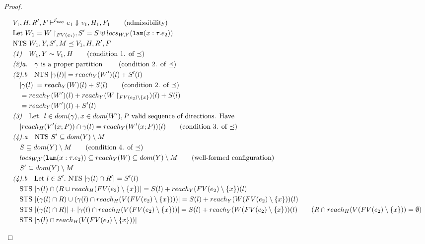 \documentclass[11pt]{article}
\newcommand{\ms}[1]{\ensuremath{\mathsf{#1}}}
\newcommand{\irl}[1]{\mathtt{#1}}
\newcommand{\copySem}{\ensuremath{\mathcal{E}_{\ms{copy}}}}
\theoremstyle{definition}
\begin{document}
\begin{proof}
\begin{description}
\begin{align*}
		&V_1,H,R',F \vdash^{\copySem} e_1 \Downarrow v_1,H_1,F_1 \tag{admissibility}\\
		&\text{Let } W_1 = W \restriction_{FV(e_1)}, S' = S \uplus locs_{W,Y}(\irl{lam}(x : \tau.e_2))\\
		&\text{NTS } W_1,Y,S',M \preceq V_1,H,R',F\\
		&\emph{(1)}\quad W_1,Y \sim V_1,H \tag{condition 1. of $\preceq$}\\
		&\emph{(2)a.}\quad \gamma \text{ is a proper partition } \tag{condition 2. of $\preceq$}\\
		&\emph{(2).b}\quad \text{NTS } |\gamma(l)| = reach_Y(W')(l) + S'(l)\\
		&\quad |\gamma(l)| = reach_Y(W)(l) + S(l) \tag{condition 2. of $\preceq$}\\
		&\quad = reach_Y(W')(l) + reach_Y(W\restriction_{FV(e_2)\setminus \{x\}})(l) + S(l)\\
		&\quad = reach_Y(W')(l) + S'(l)\\
		&\emph{(3)}\quad \text{Let. } l \in dom(\gamma), x \in dom(W'), P \text{ valid sequence of 
		directions. Have }\\
		&\quad |reach_H(V'(x;P)) \cap \gamma(l) = reach_Y(W'(x;P))(l) 
			\tag{condition 3. of $\preceq$}\\
		&\emph{(4).a}\quad \text{NTS } S' \subseteq dom(Y)\setminus M\\
		&\quad S \subseteq dom(Y)\setminus M \tag{condition 4. of $\preceq$}\\
		&\quad locs_{W,Y}(\irl{lam}(x : \tau.e_2)) \subseteq reach_Y(W) \subseteq dom(Y) \setminus M
			\tag{well-formed configuration}\\
		&\quad S' \subseteq dom(Y)\setminus M\\ 
		&\emph{(4).b}\quad \text{Let } l \in S'. \text{ NTS } |\gamma(l) \cap R'| = S'(l)\\
		&\quad \text{STS }  |\gamma(l) \cap (R \cup reach_H(FV(e_2) \setminus \{x\})| = S(l) + 
			reach_Y(FV(e_2) \setminus \{x\})(l)\\
		&\quad \text{STS } |(\gamma(l) \cap R) \cup (\gamma(l) \cap 
			reach_H(V(FV(e_2) \setminus \{x\})))| 
			= S(l) + reach_Y(W(FV(e_2) \setminus \{x\}))(l)\\
		&\quad \text{STS } |(\gamma(l) \cap R)| + |\gamma(l) \cap reach_H(V(FV(e_2) \setminus \{x\}))| 
			= S(l) + reach_Y(W(FV(e_2) \setminus \{x\}))(l) 
			\tag{$R \cap reach_H(V(FV(e_2) \setminus \{x\})) = \emptyset$}\\
		&\quad \text{STS } |\gamma(l) \cap reach_H(V(FV(e_2) \setminus \{x\}))| 

\end{align*}
\end{description}
\end{proof}
\end{document}
